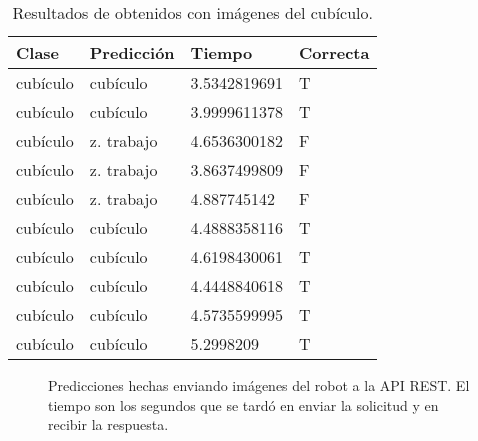 \begin{table}[H]
\centering
\begin{tabular}{|l|l|l|l|}
\hline
Clase   & Predicción & Tiempo        & Correcta \\ \hline
cubículo & cubículo    & 3.5342819691 & T        \\ \hline
cubículo & cubículo    & 3.9999611378 & T        \\ \hline
cubículo & z. trabajo & 4.6536300182 & F        \\ \hline
cubículo & z. trabajo & 3.8637499809 & F        \\ \hline
cubículo & z. trabajo & 4.887745142  & F        \\ \hline
cubículo & cubículo    & 4.4888358116 & T        \\ \hline
cubículo & cubículo    & 4.6198430061 & T        \\ \hline
cubículo & cubículo    & 4.4448840618 & T        \\ \hline
cubículo & cubículo    & 4.5735599995 & T        \\ \hline
cubículo & cubículo    & 5.2998209    & T        \\ \hline
\end{tabular}
\caption{Resultados de obtenidos con imágenes del cubículo.}
\label{table:office}
\end{table}

\begin{figure}[H] 
  \centering
{}
\qquad
{}
\qquad
{}
\qquad
{}
\caption{Predicciones hechas enviando imágenes del robot a la API REST. El tiempo son los
segundos que se tardó en enviar la solicitud y en recibir la respuesta. \label{nao_api_images}}
\end{figure}







 

